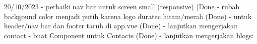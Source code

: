 20/10/2023
    - perbaiki nav bar untuk screen small (responsive) (Done
    - rubah backgound color menjadi putih karena logo duratec hitam/merah (Done)
    - untuk header/nav bar dan footer taruh di app.vue (Done)
    - lanjutkan mengerjakan contact
         - buat Component untuk Contacts (Done)
    - lanjutkan mengerjakan blogs:
